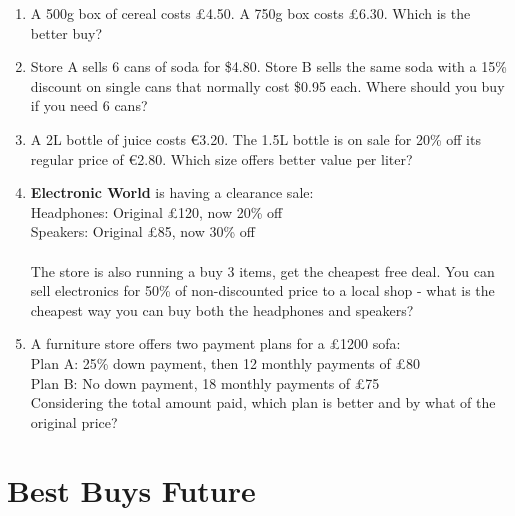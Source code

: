 \documentclass[12pt]{article}
\newcommand{\ealtext}[1]{\foreignlanguage{polish}{#1}}
\newlength{\ealglosswd}
\newlength{\ealglossraise}
\newcommand{\ealkey}[1]{\textcolor{ealkeycolour}{#1}}
\newcommand{\ealgloss}[2]{%
  \sbox{\ealboxen}{\ealkey{#1}}%
  \sbox{\ealboxtr}{\small\textcolor{ealtwocolour}{\ealtext{#2}}}%
  \setlength{\ealglosswd}{\wd\ealboxen}%
  \ifdim\wd\ealboxtr>\ealglosswd\setlength{\ealglosswd}{\wd\ealboxtr}\fi
  \leavevmode
  \makebox[\ealglosswd][c]{%
    \makebox[0pt][c]{\usebox{\ealboxen}}%
    \makebox[0pt][c]{\raisebox{\ealglossraise}{\usebox{\ealboxtr}}}%
  }%
}
\newenvironment{ealglossed}{\par\linespread{2.1}\selectfont\ignorespaces}{\par}
\begin{document}
\begin{enumerate}[resume]
\item A 500g box of cereal costs £4.50. A 750g box costs £6.30. Which is the better buy?

\item Store A sells 6 cans of soda for \$4.80. Store B sells the same soda with a 15\% discount on single cans that normally cost \$0.95 each. Where should you buy if you need 6 cans?

\item A 2L bottle of juice costs €3.20. The 1.5L bottle is on sale for 20\% off its regular price of €2.80. Which size offers better value per liter?

\item \textbf{Electronic World} is having a clearance sale: \\
Headphones: Original £120, now 20\% off \\
Speakers: Original £85, now 30\% off \\ \\
The store is also running a buy 3 items, get the cheapest free deal. You can sell electronics for 50\% of non-discounted price to a local shop - what is the cheapest way you can buy both the headphones and speakers?

\item \begin{ealglossed}
A furniture store offers two payment plans for a £1200 sofa: \\
Plan A: 25\% down payment, then 12 monthly payments of £80 \\
Plan B: No down payment, 18 monthly payments of £75 \\
Considering the total amount paid, which plan is better and by what \ealgloss{percentage}{procent} of the original price?
\end{ealglossed}
\end{enumerate}

\vspace{2cm}

\section*{Best Buys Future}
\end{document}
